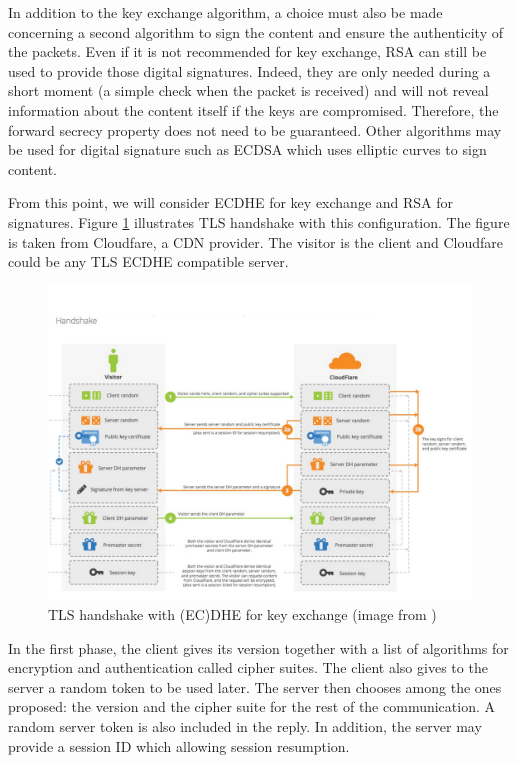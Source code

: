 In addition to the key exchange algorithm, a choice must also be made concerning a second algorithm to sign the content and ensure the authenticity of the packets. Even if it is not recommended for key exchange, RSA can still be used to provide those digital signatures. Indeed, they are only needed during a short moment (a simple check when the packet is received) and will not reveal information about the content itself if the keys are compromised. Therefore, the forward secrecy property does not need to be guaranteed. Other algorithms may be used for digital signature such as ECDSA \cite{johnson2001elliptic} which uses elliptic curves to sign content.

From this point, we will consider ECDHE for key exchange and RSA for signatures. Figure \ref{fig:tls_handshake} illustrates TLS handshake with this configuration. The figure is taken from Cloudfare, a CDN provider. The visitor is the client and Cloudfare could be any TLS ECDHE compatible server. 

\begin{figure}[!ht]
\centering
\includegraphics[width=\linewidth]{images/ECDHEhandshake}
\caption[TLS handshake with ECDHE]{TLS handshake with (EC)DHE for key exchange (image from \cite{tlsdhhandshake})}
\label{fig:tls_handshake}
\end{figure}

In the first phase, the client gives its version together with a list of algorithms for encryption and authentication called cipher suites. The client also gives to the server a random token to be used later. The server then chooses among the ones proposed: the version and the cipher suite for the rest of the communication. A random server token is also included in the reply. In addition, the server may provide a session ID which allowing session resumption.

